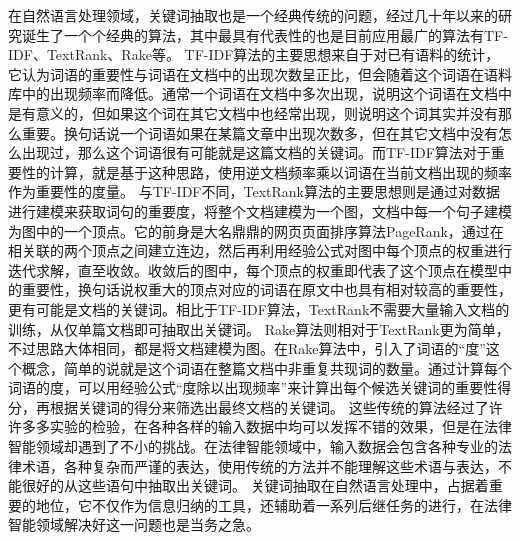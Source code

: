 在自然语言处理领域，关键词抽取也是一个经典传统的问题，经过几十年以来的研究诞生了一个个经典的算法，其中最具有代表性的也是目前应用最广的算法有TF-IDF、TextRank、Rake等。
TF-IDF算法的主要思想来自于对已有语料的统计，它认为词语的重要性与词语在文档中的出现次数呈正比，但会随着这个词语在语料库中的出现频率而降低。通常一个词语在文档中多次出现，说明这个词语在文档中是有意义的，但如果这个词在其它文档中也经常出现，则说明这个词其实并没有那么重要。换句话说一个词语如果在某篇文章中出现次数多，但在其它文档中没有怎么出现过，那么这个词语很有可能就是这篇文档的关键词。而TF-IDF算法对于重要性的计算，就是基于这种思路，使用逆文档频率乘以词语在当前文档出现的频率作为重要性的度量。
与TF-IDF不同，TextRank算法的主要思想则是通过对数据进行建模来获取词句的重要度，将整个文档建模为一个图，文档中每一个句子建模为图中的一个顶点。它的前身是大名鼎鼎的网页页面排序算法PageRank，通过在相关联的两个顶点之间建立连边，然后再利用经验公式对图中每个顶点的权重进行迭代求解，直至收敛。收敛后的图中，每个顶点的权重即代表了这个顶点在模型中的重要性，换句话说权重大的顶点对应的词语在原文中也具有相对较高的重要性，更有可能是文档的关键词。相比于TF-IDF算法，TextRank不需要大量输入文档的训练，从仅单篇文档即可抽取出关键词。
Rake算法则相对于TextRank更为简单，不过思路大体相同，都是将文档建模为图。在Rake算法中，引入了词语的“度”这个概念，简单的说就是这个词语在整篇文档中非重复共现词的数量。通过计算每个词语的度，可以用经验公式“度除以出现频率”来计算出每个候选关键词的重要性得分，再根据关键词的得分来筛选出最终文档的关键词。
这些传统的算法经过了许许多多实验的检验，在各种各样的输入数据中均可以发挥不错的效果，但是在法律智能领域却遇到了不小的挑战。在法律智能领域中，输入数据会包含各种专业的法律术语，各种复杂而严谨的表达，使用传统的方法并不能理解这些术语与表达，不能很好的从这些语句中抽取出关键词。
关键词抽取在自然语言处理中，占据着重要的地位，它不仅作为信息归纳的工具，还辅助着一系列后继任务的进行，在法律智能领域解决好这一问题也是当务之急。










